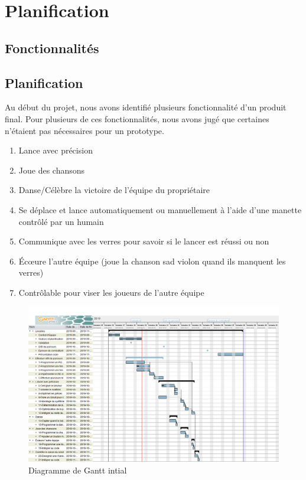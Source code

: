 \section{Planification}


\subsection{Fonctionnalités}

\subsection{Planification}



Au début du projet, nous avons identifié plusieurs fonctionnalité d'un produit final.
Pour plusieurs de ces fonctionnalités, nous avons jugé que certaines n'étaient pas nécessaires pour un prototype.

\begin{enumerate}
    \item Lance avec précision
    \item Joue des chansons
    \item Danse/Célèbre la victoire de l’équipe du propriétaire
    \item Se déplace et lance automatiquement ou manuellement à l’aide d’une manette contrôlé par un humain
    \item Communique avec les verres pour savoir si le lancer est réussi ou non
    \item Écœure l’autre équipe (joue la chanson sad violon quand ils manquent les verres)
    \item Contrôlable pour viser les joueurs de l’autre équipe
\end{enumerate}

\begin{figure}[h!]
    \centering
    \includegraphics[width=\linewidth]{img/s1/robuck-2019-09-26}
    \caption{Diagramme de Gantt intial}
    \label{fig:planif-initial}
\end{figure}

